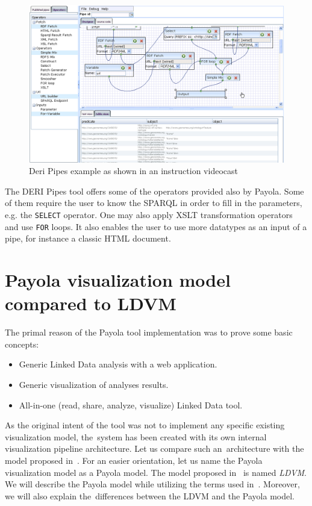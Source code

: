 \begin{figure}
	\centering
	\includegraphics[width=140mm]{img/deri.png}
	\caption{Deri Pipes example as shown in an instruction videocast~\cite{deri-screen-source}}
	\label{fig:deri}
\end{figure}

The DERI Pipes tool offers some of the operators provided also by Payola. Some 
of them require the user to know the SPARQL in order to fill in the 
parameters, e.g. the \texttt{SELECT} operator. One may also apply XSLT 
transformation operators and use \texttt{FOR} loops. It also enables the user to use more datatypes as an input 
of a pipe, for instance a classic HTML document.

\section{Payola visualization model compared to LDVM}
The primal reason of the Payola tool implementation was to prove some basic concepts:

\begin{itemize}
\item Generic Linked Data analysis with a web application.
\item Generic visualization of analyses results.
\item All-in-one (read, share, analyze, visualize) Linked Data tool.
\end{itemize}

As the original intent of the tool was not to implement any specific existing visualization model,
the~system has been created with its own internal visualization pipeline architecture. Let us compare such
an~architecture with the model proposed in~\cite{ldvm}. For an easier orientation, let us name the Payola visualization 
model as a Payola model. The model proposed in~\cite{ldvm} is named \emph{LDVM}. We will describe the Payola
model while utilizing the terms used in~\cite{ldvm}. Moreover, we will also explain
the~differences between the LDVM and the Payola model.

